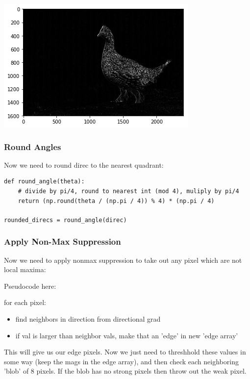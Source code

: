 \documentclass[11pt]{article}
\begin{document}
\includegraphics[width=.9\linewidth]{./obipy-resources/33308Z.png}

\subsubsection*{Round Angles}
\label{sec-5-1-2}

Now we need to round direc to the nearest quadrant:

\begin{verbatim}
def round_angle(theta):
    # divide by pi/4, round to nearest int (mod 4), muliply by pi/4
    return (np.round(theta / (np.pi / 4)) % 4) * (np.pi / 4)

rounded_direcs = round_angle(direc)
\end{verbatim}

\subsubsection*{Apply Non-Max Suppression}
\label{sec-5-1-3}

Now we need to apply nonmax suppression to take out any pixel which are not
local maxima:

Pseudocode here:

for each pixel:
\begin{itemize}
\item find neighbors in direction from directional grad
\item if val is larger than neighbor vals, make that an 'edge' in new 'edge array'
\end{itemize}

This will give us our edge pixels. Now we just need to threshhold these values
in some way (keep the mags in the edge array), and then check each neighboring
'blob' of 8 pixels. If the blob has no strong pixels then throw out the weak
pixel.
\end{document}
